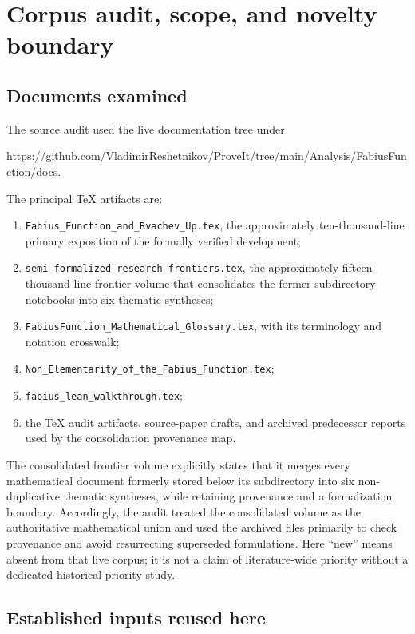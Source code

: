 \documentclass[11pt]{article}
\theoremstyle{definition}
\theoremstyle{remark}
\begin{document}
\tableofcontents
\clearpage

\section{Corpus audit, scope, and novelty boundary}

\subsection{Documents examined}

The source audit used the live documentation tree under \cite{ReshetnikovRepo}
\begin{center}
\small\url{https://github.com/VladimirReshetnikov/ProveIt/tree/main/Analysis/FabiusFunction/docs}.
\end{center}
The principal TeX artifacts are:
\begin{enumerate}[leftmargin=2em]
  \item \texttt{Fabius\_Function\_and\_Rvachev\_Up.tex}, the approximately ten-thousand-line primary exposition of the formally verified development;
  \item \texttt{semi-formalized-research-frontiers.tex}, the approximately fifteen-thousand-line frontier volume that consolidates the former subdirectory notebooks into six thematic syntheses;
  \item {\small\texttt{FabiusFunction\_Mathematical\_Glossary.tex}}, with its terminology and notation crosswalk;
  \item \texttt{Non\_Elementarity\_of\_the\_Fabius\_Function.tex};
  \item \texttt{fabius\_lean\_walkthrough.tex};
  \item the TeX audit artifacts, source-paper drafts, and archived predecessor reports used by the consolidation provenance map.
\end{enumerate}
The consolidated frontier volume explicitly states that it merges every mathematical document formerly stored below its subdirectory into six non-duplicative thematic syntheses, while retaining provenance and a formalization boundary.  Accordingly, the audit treated the consolidated volume as the authoritative mathematical union and used the archived files primarily to check provenance and avoid resurrecting superseded formulations.  Here ``new'' means absent from that live corpus; it is not a claim of literature-wide priority without a dedicated historical priority study.

\subsection{Established inputs reused here}
\end{document}
